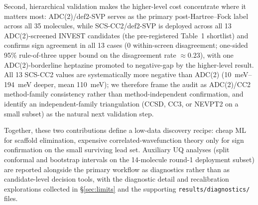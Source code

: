 \documentclass[journal=jcisd8,manuscript=article]{achemso}
\begin{document}
Second, hierarchical validation makes the higher-level cost concentrate where it matters most: ADC(2)/def2-SVP serves as the primary post-Hartree--Fock label across all 35 molecules, while SCS-CC2/def2-SVP is deployed across all 13 ADC(2)-screened INVEST candidates (the pre-registered Table~1 shortlist) and confirms sign agreement in all 13 cases (0 within-screen disagreement; one-sided 95\% rule-of-three upper bound on the disagreement rate $\approx 0.23$), with one ADC(2)-borderline heptazine promoted to negative-gap by the higher-level result. All 13 SCS-CC2 values are systematically more negative than ADC(2) (\SIrange{10}{194}{meV} deeper, mean \SI{110}{meV}); we therefore frame the audit as ADC(2)/CC2 method-family consistency rather than method-independent confirmation, and identify an independent-family triangulation (CCSD, CC3, or NEVPT2 on a small subset) as the natural next validation step.

Together, these two contributions define a low-data discovery recipe: cheap ML for scaffold elimination, expensive correlated-wavefunction theory only for sign confirmation on the small surviving lead set. Auxiliary UQ analyses (split conformal and bootstrap intervals on the 14-molecule round-1 deployment subset) are reported alongside the primary workflow as diagnostics rather than as candidate-level decision tools, with the diagnostic detail and recalibration explorations collected in \S\ref{sec:limits} and the supporting \texttt{results/diagnostics/} files.


\end{document}
